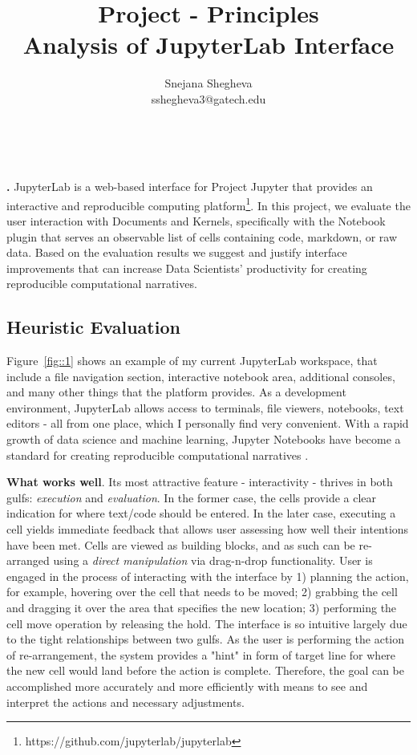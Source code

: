 \documentclass[12pt,letterpaper]{article}
\makeatletter
\renewcommand{\maketitle}{\bgroup
   \begin{center}
   \textbf{{\fontsize{18pt}{20}\selectfont \@title}}\\
   \vspace{10pt}
   {\fontsize{12pt}{0}\selectfont \@author} 
   \end{center}
}
\newenvironment{myquote}[1]%
  {\list{}{\leftmargin=#1\rightmargin=#1}\item[]}%
  {\endlist}
\renewenvironment{abstract}
{\vspace*{-.5in}\fontsize{12pt}{12}\begin{myquote}{.5in}
\noindent \par{\bfseries \abstractname.}}
{\medskip\noindent
\end{myquote}
}
\makeatother
\begin{document}
\title{Project - Principles\\Analysis of JupyterLab Interface}
\author{Snejana Shegheva \\ sshegheva3@gatech.edu}

\maketitle
\thispagestyle{fancy}

\begin{abstract}
JupyterLab is a web-based interface for Project Jupyter that provides an interactive and reproducible computing platform\footnote{https://github.com/jupyterlab/jupyterlab}. In this project, we evaluate the user interaction with Documents and Kernels, specifically with the Notebook plugin that serves an observable list of cells containing code, markdown, or raw data. Based on the evaluation results we suggest and justify interface improvements that can increase Data Scientists' productivity for creating reproducible computational narratives.
\end{abstract}

\subsection*{Heuristic Evaluation}
Figure~\ref{fig::1} shows an example of my current JupyterLab workspace, that include a file navigation section, interactive notebook area, additional consoles, and many other things that the platform provides. As a development environment, JupyterLab allows access to terminals, file viewers, notebooks, text editors - all from one place, which I personally find very convenient. With a rapid growth of data science and machine learning, Jupyter Notebooks have become a standard for creating reproducible computational narratives \cite{blog:jupyter}. 

\textbf{What works well}. Its most attractive feature - interactivity - thrives in both gulfs: \textit{execution} and \textit{evaluation}. In the former case, the cells provide a clear indication for where text/code should be entered. In the later case, executing a cell yields immediate feedback that allows user assessing how well their intentions have been met. Cells are viewed as building blocks, and as such can be re-arranged using a \textit{direct manipulation} via drag-n-drop functionality. User is engaged in the process of interacting with the interface by 1) planning the action, for example, hovering over the cell that needs to be moved; 2) grabbing the cell and dragging it over the area that specifies the new location; 3) performing the cell move operation by releasing the hold. The interface is so intuitive largely due to the tight relationships between two gulfs. As the user is performing the action of re-arrangement, the system provides a "hint" in form of target line for where the new cell would land before the action is complete. Therefore, the goal can be accomplished more accurately and more efficiently with means to see and interpret the actions and necessary adjustments.      
\end{document}
